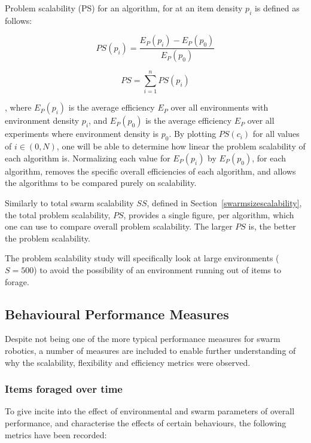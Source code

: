 Problem scalability (PS) for an algorithm, for at an item density $p_i$ is defined as follows:

\begin{equation}
	PS(p_i) = \dfrac{E_P(p_i)-E_P(p_0)}{E_P(p_0)}
\end{equation}

\begin{equation}
	PS = \sum_{i=1}^{n} PS(p_i)
\end{equation}

, where $E_P(p_i)$ is the average efficiency $E_P$ over all environments with environment density $p_i$, and $E_P(p_0)$ is the average efficiency $E_P$ over all experiments where environment density is $p_0$. By plotting $PS(c_i)$ for all values of $i\in(0,N)$, one will be able to determine how linear the problem scalability of each algorithm is. Normalizing each value for $E_P(p_i)$ by $E_P(p_0)$, for each algorithm, removes the specific overall efficiencies of each algorithm, and allows the algorithms to be compared purely on scalability.

Similarly to total swarm scalability $SS$, defined in Section~\ref{swarmsizescalability}, the total problem scalability, $PS$, provides a single figure, per algorithm, which one can use to compare overall problem scalability. The larger $PS$ is, the better the problem scalability.

The problem scalability study will specifically look at large environments ($S=500$) to avoid the possibility of an environment running out of items to forage.

\subsection{Behavioural Performance Measures}
\label{behaviouralperformancemeasures}

Despite not being one of the more typical performance measures for swarm robotics, a number of measures are included to enable further understanding of why the scalability, flexibility and efficiency metrics were observed.

\subsubsection{Items foraged over time}
To give incite into the effect of environmental and swarm parameters of overall performance, and characterise the effects of certain behaviours, the following metrics have been recorded:

